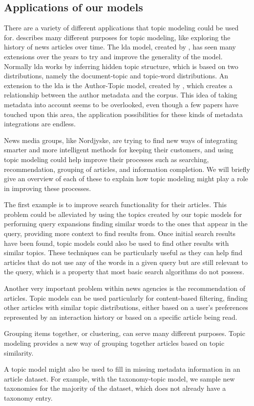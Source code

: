 \subsection{Applications of our models}\label{sec:appendix_applications}
There are a variety of different applications that topic modeling could be used for. 
\citet{Probabilistic_Topic_Models} describes many different purposes for topic modeling, like exploring the history of news articles over time.
The \gls{lda} model, created by \citet{blei2003latent}, has seen many extensions over the years to try and improve the generality of the model.
Normally \gls{lda} works by inferring hidden topic structure, which is based on two distributions, namely the document-topic and topic-word distributions.
An extension to the \gls{lda} is the Author-Topic model, created by \citet{author_topic_2012}, which creates a relationship between the author metadata and the corpus.
This idea of taking metadata into account seems to be overlooked, even though a few papers have touched upon this area, the application possibilities for these kinds of metadata integrations are endless.

News media groups, like Nordjyske, are trying to find new ways of integrating smarter and more intelligent methods for keeping their customers, and using topic modeling could help improve their processes such as searching, recommendation, grouping of articles, and information completion.
We will briefly give an overview of each of these to explain how topic modeling might play a role in improving these processes.

The first example is to improve search functionality for their articles.
This problem could be alleviated by using the topics created by our topic models for performing query expansions finding similar words to the ones that appear in the query, providing more context to find results from.
Once initial search results have been found, topic models could also be used to find other results with similar topics.
These techniques can be particularly useful as they can help find articles that do not use any of the words in a given query but are still relevant to the query, which is a property that most basic search algorithms do not possess.

Another very important problem within news agencies is the recommendation of articles.
Topic models can be used particularly for content-based filtering, finding other articles with similar topic distributions, either based on a user's preferences represented by an interaction history or based on a specific article being read.

Grouping items together, or clustering, can serve many different purposes. 
Topic modeling provides a new way of grouping together articles based on topic similarity.

A topic model might also be used to fill in missing metadata information in an article dataset.
For example, with the taxonomy-topic model, we sample new taxonomies for the majority of the dataset, which does not already have a taxonomy entry.
